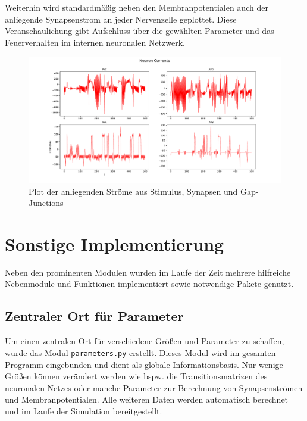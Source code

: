 	Weiterhin wird standardmäßig neben den Membranpotentialen auch der anliegende Synapsenstrom an jeder Nervenzelle geplottet. Diese Veranschaulichung gibt Aufschluss über die gewählten Parameter und das Feuerverhalten im internen neuronalen Netzwerk.
	\begin{figure}[H] %
		\centering
		\includegraphics[width=16cm]{figures/chap_implement/plot_synstrom.pdf}
		\caption{Plot der anliegenden Ströme aus Stimulus, Synapsen und Gap-Junctions}
		\label{fig:plot_synstrom}
	\end{figure}

\section{Sonstige Implementierung}
\label{sec:imp_sonst}
	Neben den prominenten Modulen wurden im Laufe der Zeit mehrere hilfreiche Nebenmodule und Funktionen implementiert sowie notwendige Pakete genutzt.
	\subsection{Zentraler Ort für Parameter}
		Um einen zentralen Ort für verschiedene Größen und Parameter zu schaffen, wurde das Modul \texttt{parameters.py} erstellt. Dieses Modul wird im gesamten Programm eingebunden und dient als globale Informationsbasis. Nur wenige Größen können verändert werden wie bspw. die Transitionsmatrizen des neuronalen Netzes oder manche Parameter zur Berechnung von Synapsenströmen und Membranpotentialen. Alle weiteren Daten werden automatisch berechnet und im Laufe der Simulation bereitgestellt.
